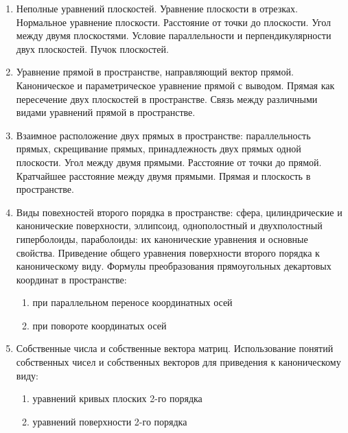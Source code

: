 \documentclass[a4paper,12pt,russian]{extreport}
\begin{document}
\begin{enumerate}
\item Неполные уравнений плоскостей. Уравнение плоскости в отрезках. Нормальное уравнение плоскости. Расстояние от точки до плоскости. Угол между двумя плоскостями. Условие параллельности и перпендикулярности двух плоскостей. Пучок плоскостей.
\item Уравнение прямой в пространстве, направляющий вектор прямой. Каноническое и параметрическое уравнение прямой с выводом. Прямая как пересечение двух плоскостей в пространстве. Связь между различными видами уравнений прямой в пространстве.
\item Взаимное расположение двух прямых в пространстве: параллельность прямых, скрещивание прямых, принадлежность двух прямых одной плоскости. Угол между двумя прямыми. Расстояние от точки до прямой. Кратчайшее расстояние между двумя прямыми. Прямая и плоскость в пространстве.
\item Виды повехностей второго порядка в пространстве: сфера, цилиндрические и канонические поверхности, эллипсоид, однополостный и двухполостный гиперболоиды, параболоиды: их канонические уравнения и основные свойства. Приведение общего уравнения поверхности второго порядка к каноническому виду. Формулы преобразования прямоугольных декартовых координат в пространстве:
  \begin{enumerate}
  \item при параллельном переносе координатных осей
  \item при повороте координатых осей
  \end{enumerate}
\item Собственные числа и собственные вектора матриц. Использование понятий собственных чисел и собственных векторов для приведения к каноническому виду:
  \begin{enumerate}
  \item уравнений кривых плоских 2-го порядка
  \item уравнений поверхности 2-го порядка
  \end{enumerate}
\end{enumerate}
\end{document}
